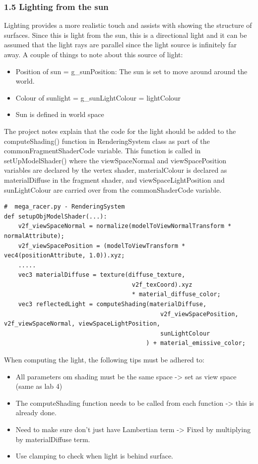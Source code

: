 \documentclass[a4 paper, 12pt]{article}
\begin{document}
\subsubsection{1.5 Lighting from the sun}  
Lighting provides a more realistic touch and assists with showing the structure of surfaces. Since this is light from the sun, this is a directional light and it can be assumed that the light rays are parallel since the light source is infinitely far away. A couple of things to note about this source of light:
\begin{itemize}
    \item Position of sun = g\_sunPosition: The sun is set to move around around the world.
    \item Colour of sunlight = g\_sunLightColour = lightColour
    \item Sun is defined in world space
\end{itemize}

The project notes explain that the code for the light should be added to the computeShading() function in RenderingSystem class as part of the commonFragmentShaderCode variable. This function is called in setUpModelShader() where the viewSpaceNormal and viewSpacePosition variables are declared by the vertex shader, materialColour is declared as materialDiffuse in the fragment shader, and viewSpaceLightPosition and sunLightColour are carried over from the commonShaderCode variable. 
    \begin{lstlisting}
#  mega_racer.py - RenderingSystem
def setupObjModelShader(...):
    v2f_viewSpaceNormal = normalize(modelToViewNormalTransform * normalAttribute);
    v2f_viewSpacePosition = (modelToViewTransform * vec4(positionAttribute, 1.0)).xyz;
    .....
    vec3 materialDiffuse = texture(diffuse_texture, 
                                    v2f_texCoord).xyz 
                                    * material_diffuse_color;
    vec3 reflectedLight = computeShading(materialDiffuse, 
                                            v2f_viewSpacePosition, v2f_viewSpaceNormal, viewSpaceLightPosition, 
                                            sunLightColour
                                        ) + material_emissive_color;
    \end{lstlisting}

When computing the light, the following tips must be adhered to:
    \begin{itemize}     
        \item All parameters om shading must be the same space -> set as view space (same as lab 4)         
        \item The computeShading function needs to be called from each function -> this is already done.
        \item Need to make sure don't just have Lambertian term -> Fixed by multiplying by materialDiffuse term.
        \item Use clamping to check when light is behind surface.
    \end{itemize}
\end{document}
